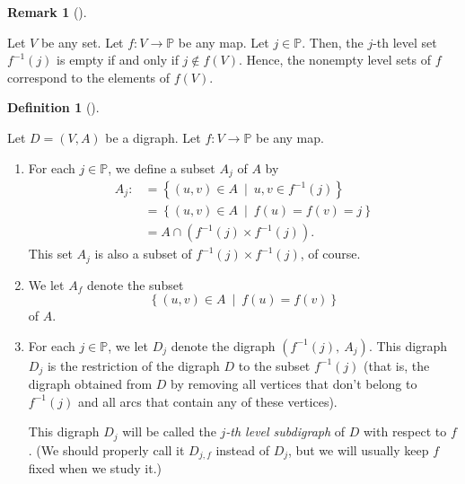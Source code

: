 \documentclass[numbers=enddot,12pt,final,onecolumn,notitlepage]{scrartcl}%
\numberwithin{exer}{section}
\theoremstyle{definition}
\newtheorem{defi}[theo]{Definition}
\newenvironment{definition}[1][]
{\begin{defi}[#1]\begin{leftbar}}
{\end{leftbar}\end{defi}}
\newtheorem{remk}[theo]{Remark}
\newenvironment{remark}[1][]
{\begin{remk}[#1]\begin{leftbar}}
{\end{leftbar}\end{remk}}
\begin{document}
\begin{remark}
Let $V$ be any set. Let $f:V\rightarrow\mathbb{P}$ be any map. Let
$j\in\mathbb{P}$. Then, the $j$-th level set $f^{-1}\left(  j\right)  $ is
empty if and only if $j\notin f\left(  V\right)  $. Hence, the nonempty level
sets of $f$ correspond to the elements of $f\left(  V\right)  $.
\end{remark}

\begin{definition}
\label{def.level.levsubdig}Let $D=\left(  V,A\right)  $ be a digraph. Let
$f:V\rightarrow\mathbb{P}$ be any map.

\begin{enumerate}
\item[\textbf{(a)}] For each $j\in\mathbb{P}$, we define a subset $A_{j}$ of
$A$ by%
\begin{align}
A_{j}:  &  =\left\{  \left(  u,v\right)  \in A\ \mid\ u,v\in f^{-1}\left(
j\right)  \right\} \label{eq.def.level.levsubdig.a.Aj=1}\\
&  =\left\{  \left(  u,v\right)  \in A\ \mid\ f\left(  u\right)  =f\left(
v\right)  =j\right\} \label{eq.def.level.levsubdig.a.Aj=2}\\
&  =A\cap\left(  f^{-1}\left(  j\right)  \times f^{-1}\left(  j\right)
\right)  . \label{eq.def.level.levsubdig.a.Aj=3}%
\end{align}
This set $A_{j}$ is also a subset of $f^{-1}\left(  j\right)  \times
f^{-1}\left(  j\right)  $, of course.

\item[\textbf{(b)}] We let $A_{f}$ denote the subset
\[
\left\{  \left(  u,v\right)  \in A\ \mid\ f\left(  u\right)  =f\left(
v\right)  \right\}
\]
of $A$.

\item[\textbf{(c)}] For each $j\in\mathbb{P}$, we let $D_{j}$ denote the
digraph $\left(  f^{-1}\left(  j\right)  ,\ A_{j}\right)  $. This digraph
$D_{j}$ is the restriction of the digraph $D$ to the subset $f^{-1}\left(
j\right)  $ (that is, the digraph obtained from $D$ by removing all vertices
that don't belong to $f^{-1}\left(  j\right)  $ and all arcs that contain any
of these vertices).

This digraph $D_{j}$ will be called the $j$\emph{-th level subdigraph} of $D$
with respect to $f$. (We should properly call it $D_{j,f}$ instead of $D_{j}$,
but we will usually keep $f$ fixed when we study it.)
\end{enumerate}
\end{definition}
\end{document}
